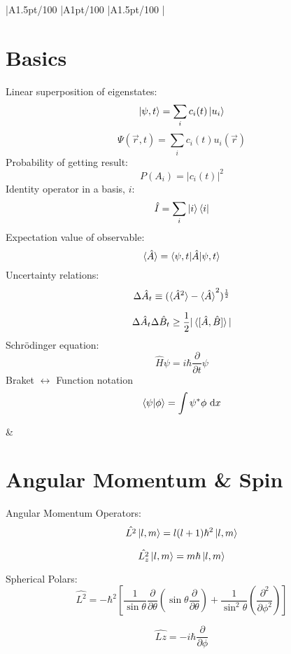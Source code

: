 \documentclass[table,cmyk]{article}
\makeatletter
\newcommand\ratio[2]{\strip@pt\dimexpr#1pt/#2\relax}
\makeatother
\begin{document}
\begin{longtable}
{
    |A{1.5}{\ratio{30}{100}}%
    |A{1}{\ratio{30}{100}}%
    |A{1.5}{\ratio{30}{100}}%
    |%
}\hline
\section*{Basics}
Linear superposition of eigenstates:
\[
\ket{\psi,t} = \sum_{i} c_i(t)\ket{u_i}
\]
\[
\Psi(\vec{r},t) = \sum_{i} c_i(t)u_i(\vec{r})
\]
Probability of getting result:
\[
P(A_i) = |c_i(t)|^2\]
Identity operator in a basis, $i$:
  \[
  \hat I=\sum_{i}\ket{i}\bra{i}
  \]  
Expectation value of observable:
\[\braket{\hat{A}} = \braket{\psi, t|\hat{A}|\psi, t}\]
Uncertainty relations:
\[\Delta\hat{A}_t \equiv (\braket{\hat{A}^2} - \braket{\hat{A}}^2)^{\frac{1}{2}}\]

\[\Delta\hat{A}_t\Delta\hat{B}_t \ge \frac{1}{2} |\braket{[ \hat{A},\hat{B} ]}|\]
Schr\"odinger equation:
  \[
  \hat H\psi = i \hbar \frac{\partial}{\partial t} \psi
  \]
Braket $\leftrightarrow$ Function notation
  \[
  \braket{\psi|\phi}=\int \psi^*\phi\  \mathrm{d}x
  \]



&
\section*{Angular Momentum \& Spin}
Angular Momentum Operators:
\[
\hat{L^2}\ket{l,m} = l(l+1)\hbar^2\ket{l,m}
\]

\[\hat{L^2_z} \ket{l,m} = m\hbar\ket{l,m}\]

Spherical Polars:
\[ \hat{L^2} = -\hbar^2\left[\frac{1}{\sin{\theta}} \frac{\partial}{\partial\theta}\left(\sin{\theta}\frac{\partial}{\partial\theta}\right)+\frac{1}{\sin^2{\theta}} \left( \frac{\partial^2}{\partial\phi^2}\right) \right] \]

\[ \hat{Lz} = -i\hbar\frac{\partial}{\partial\phi}\]

\end{longtable}
\end{document}
